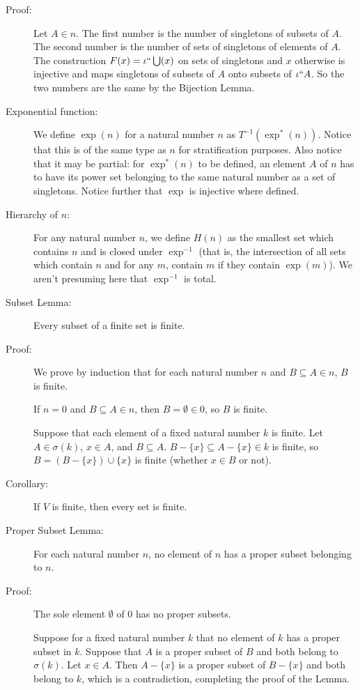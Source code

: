 \documentclass[12pt]{article}
\begin{document}
\begin{description}
\item[Proof:]   Let $A \in n$.  The first number is the number of  singletons of subsets of $A$.  The second number  is the number of sets of singletons of elements of $A$.
The construction $F(x) = \iota``\bigcup(x)$ on sets of singletons and $x$ otherwise is injective and maps singletons of subsets of $A$ onto subsets of $\iota``A$.  So the two numbers
are the same by the Bijection Lemma.

\item[Exponential function:]  We define $\exp(n)$ for a natural number $n$ as $T^{-1}(\exp^*(n))$.  Notice that this is of the same type as $n$ for stratification purposes.  Also notice that it may be partial:  for $\exp^*(n)$ to be defined, 
an element $A$ of $n$ has to have its power set belonging to the same natural number as a set of singletons.  Notice further that $\exp$ is injective where defined.

\item[Hierarchy of $n$:]  For any natural number $n$, we define $H(n)$ as the smallest set which contains $n$ and is closed under $\exp^{-1}$ (that is, the intersection of all sets which contain $n$ and
for any $m$, contain $m$ if they contain $\exp(m)$).  We aren't presuming here that $\exp^{-1}$ is total.

\item[Subset Lemma:]  Every subset of a finite set is finite.

\item[Proof:]  We prove by induction that for each natural number $n$ and $B \subseteq A \in n$, $B$ is finite.

If $n=0$ and $B \subseteq A \in n$, then $B=\emptyset \in 0$, so $B$ is finite.

Suppose that each element of a fixed natural number $k$ is finite.  Let $A \in \sigma(k)$, $x \in A$, and $B \subseteq A$.  $B-\{x\} \subseteq A-\{x\}\in k$ is finite, so $B = (B-\{x\})\cup \{x\}$ is finite (whether $x \in B$ or not).

\item[Corollary:]  If $V$ is finite, then every set is finite.

\item[Proper Subset Lemma:]  For each natural number $n$, no element of $n$ has a proper subset belonging to $n$.

\item[Proof:]   The sole element $\emptyset$ of 0 has no proper subsets.


Suppose for a fixed natural number $k$ that no element of $k$ has a proper subset in $k$.  Suppose that $A$ is a proper subset of $B$ and both belong to
$\sigma(k)$.  Let $x \in A$.  Then $A-\{x\}$ is a  proper subset of $B-\{x\}$ and both belong to $k$, which is a contradiction,  completing the proof of the Lemma.



\end{description}
\end{document}
